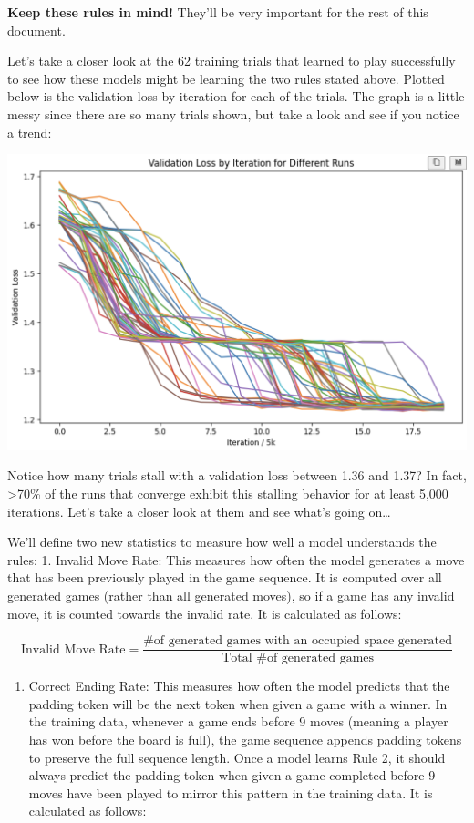 \documentclass[11pt]{article}
\providecommand{\tightlist}{%
      \setlength{\itemsep}{0pt}\setlength{\parskip}{0pt}}
\begin{document}
\textbf{Keep these rules in mind!} They'll be very important for the
rest of this document.

Let's take a closer look at the 62 training trials that learned to play
successfully to see how these models might be learning the two rules
stated above. Plotted below is the validation loss by iteration for each
of the trials. The graph is a little messy since there are so many
trials shown, but take a look and see if you notice a trend:

\begin{center}
\includegraphics[keepaspectratio]{inserted_images/converging_runs.png}
\end{center}

    Notice how many trials stall with a validation loss between 1.36 and
1.37? In fact, \textgreater70\% of the runs that converge exhibit this
stalling behavior for at least 5,000 iterations. Let's take a closer
look at them and see what's going on\ldots{}

We'll define two new statistics to measure how well a model understands
the rules: 1. Invalid Move Rate: This measures how often the model
generates a move that has been previously played in the game sequence.
It is computed over all generated games (rather than all generated
moves), so if a game has any invalid move, it is counted towards the
invalid rate. It is calculated as follows:

\[
\text{Invalid Move Rate} = \frac{\text{\# of generated games with an occupied space generated}}{\text{Total \# of generated games}}
\]

\begin{enumerate}
\def\labelenumi{\arabic{enumi}.}
\setcounter{enumi}{1}
\tightlist
\item
  Correct Ending Rate: This measures how often the model predicts that
  the padding token will be the next token when given a game with a
  winner. In the training data, whenever a game ends before 9 moves
  (meaning a player has won before the board is full), the game sequence
  appends padding tokens to preserve the full sequence length. Once a
  model learns Rule 2, it should always predict the padding token when
  given a game completed before 9 moves have been played to mirror this
  pattern in the training data. It is calculated as follows:
\end{enumerate}
\end{document}

